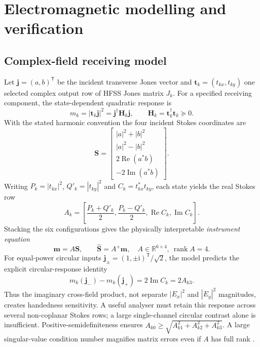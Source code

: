 \documentclass{ieeeaccess}
\begin{document}
\section{Electromagnetic modelling and verification}
\subsection{Complex-field receiving model}
\label{sec:em_operator}

Let $\boldsymbol{j}=(a,b)^{\mathsf T}$ be the incident transverse Jones vector and $\boldsymbol t_k=(t_{kx},t_{ky})$ one selected complex output row of HFSS Jones matrix $J_k$. For a specified receiving component, the state-dependent quadratic response is
\begin{equation}
 m_k=|\boldsymbol t_k\boldsymbol j|^2=\boldsymbol j^{\dagger}\mathbf H_k\boldsymbol j,
 \qquad \mathbf H_k=\boldsymbol t_k^{\dagger}\boldsymbol t_k\succeq0.
 \label{eq:main-response}
\end{equation}
With the stated harmonic convention the four incident Stokes coordinates are
\begin{equation}
\boldsymbol S=\begin{bmatrix}|a|^2+|b|^2\\|a|^2-|b|^2\\2\operatorname{Re}(a^*b)\\-2\operatorname{Im}(a^*b)\end{bmatrix}.
\label{eq:main-stokes}
\end{equation}
Writing $P_k=|t_{kx}|^2$, $Q'_k=|t_{ky}|^2$ and $C_k=t_{kx}^{*}t_{ky}$, each state yields the real Stokes row
\begin{equation}
A_k=\left[\frac{P_k+Q'_k}{2},\frac{P_k-Q'_k}{2},
 \operatorname{Re}C_k,\operatorname{Im}C_k\right].
\label{eq:main-row}
\end{equation}
Stacking the six configurations gives the physically interpretable \emph{instrument equation}
\begin{equation}
\boldsymbol m=A\boldsymbol S,\qquad
\widehat{\boldsymbol S}=A^+\boldsymbol m,
\quad A\in\mathbb R^{6\times4},\ \operatorname{rank}A=4.
\label{eq:main-inverse}
\end{equation}
For equal-power circular inputs $\boldsymbol j_\pm=(1,\pm\mathrm i)^{\mathsf T}/\sqrt 2$, the model predicts the explicit circular-response identity
\begin{equation}
 m_k(\boldsymbol j_-)-m_k(\boldsymbol j_+)=2\operatorname{Im}C_k=2A_{k3}.
 \label{eq:cp-contrast}
\end{equation}
Thus the imaginary cross-field product, not separate $|E_x|^2$ and $|E_y|^2$ magnitudes, creates handedness sensitivity. A useful analyser must retain this response across several non-coplanar Stokes rows; a large single-channel circular contrast alone is insufficient. Positive-semidefiniteness ensures $A_{k0}\ge\sqrt{A_{k1}^2+A_{k2}^2+A_{k3}^2}$. A large singular-value condition number magnifies matrix errors even if $A$ has full rank \cite{Azzam1990,Tyo2002}.
\end{document}
